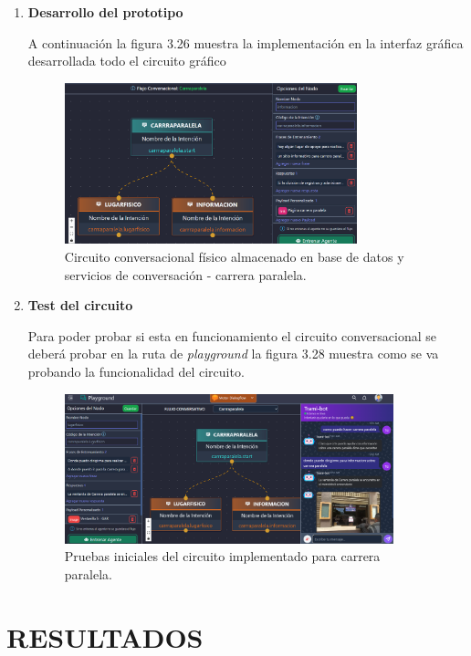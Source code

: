\documentclass[letter, openright, 12pt]{book}
\begin{document}
{\begin{enumerate}[label=(\alph*)]
	\item \textbf{Desarrollo del prototipo}
	\par A continuación la figura 3.26 muestra la implementación en la interfaz gráfica desarrollada todo el circuito gráfico
	\begin{figure}[H]
\centering
\includegraphics[width=0.8\textwidth]{figura3_27}
 \caption{Circuito conversacional físico almacenado en base de datos y servicios de conversación - carrera paralela.  }
\label{fig:figura3_27}
\end{figure}

\item \textbf{Test del circuito}
\par Para poder probar si esta en funcionamiento el circuito conversacional se deberá probar en la ruta de {\it playground} la figura 3.28 muestra como se va probando la funcionalidad del circuito.
	\begin{figure}[H]
\centering
\includegraphics[width=0.9\textwidth]{figura3_28}
 \caption{Pruebas iniciales del circuito implementado para carrera paralela.  }
\label{fig:figura3_28}
\end{figure}


\end{enumerate}


\chapter{RESULTADOS}

}
\end{document}
